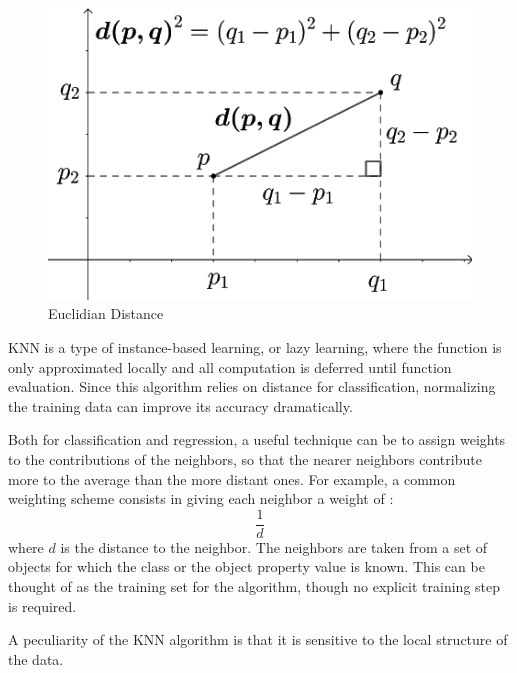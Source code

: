 \documentclass[12pt]{article}
\begin{document}
\begin{center}
\begin{figure}[h]
\centerline{\includegraphics[scale=.5]{IMG_8203.png}}
\caption{Euclidian Distance}
\end{figure}
\end{center}

KNN is a type of instance-based learning, or lazy learning, where the function is only approximated locally and all computation is deferred until function evaluation. Since this algorithm relies on distance for classification, normalizing the training data can improve its accuracy dramatically.

Both for classification and regression, a useful technique can be to assign weights to the contributions of the neighbors, so that the nearer neighbors contribute more to the average than the more distant ones. For example, a common weighting scheme consists in giving each neighbor a weight of :  
\begin{equation*}
\frac{1}{d}
\end{equation*}
where $d$ is the distance to the neighbor.
The neighbors are taken from a set of objects for which the class or the object property value is known. This can be thought of as the training set for the algorithm, though no explicit training step is required.

A peculiarity of the KNN algorithm is that it is sensitive to the local structure of the data.
\newpage
\end{document}
